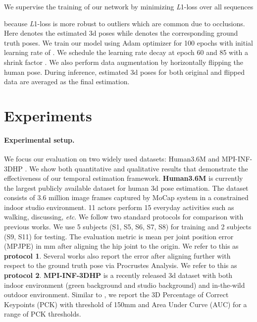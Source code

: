 \documentclass{bmvc2k}
\begin{document}
We supervise the training of our network by minimizing \textit{L}1-loss over all  sequences

because \textit{L}1-loss is more robust to outliers which are common due to occlusions. Here  denotes the estimated 3d poses while  denotes the corresponding ground truth poses. We train our model using Adam \cite{kingma2014adam} optimizer for 100 epochs with initial learning rate of . We schedule the learning rate decay at epoch 60 and 85 with a shrink factor . We also perform data augmentation by horizontally flipping the human pose. During inference, estimated 3d poses for both original and flipped data are averaged as the final estimation.



\section{Experiments}
\label{sec:result}

\paragraph{Experimental setup.} We focus our evaluation on two widely used datasets: Human3.6M \cite{ionescu2014human3} and MPI-INF-3DHP \cite{mehta2016monocular}. We show both quantitative and qualitative results that demonstrate the effectiveness of our temporal estimation framework. \textbf{Human3.6M} is currently the largest publicly available dataset for human 3d pose estimation. The dataset consists of 3.6 million image frames captured by MoCap system in a constrained indoor studio environment. 11 actors perform 15 everyday activities such as walking, discussing, \textit{etc}. We follow two standard protocols for comparison with previous works. We use 5 subjects (S1, S5, S6, S7, S8) for training and 2 subjects (S9, S11) for testing. The evaluation metric is mean per joint position error (MPJPE) in mm after aligning the hip joint to the origin. We refer to this as {\bf protocol 1}. Several works \cite{bogo2016keep,pavlakos2017coarse,sun2017compositional,lee2018propagating,dabral2018learning,zhou2016sparseness,moreno20173d,nie2017monocular,martinez2017simple,fang2018learning,hossain2018exploiting, pavllo20183d} also report the error after aligning further with respect to the ground truth pose via Procrustes Analysis. We refer to this as {\bf protocol 2}. \textbf{MPI-INF-3DHP} is a recently released 3d dataset with both indoor environment (green background and studio background) and in-the-wild outdoor environment. Similar to \cite{mehta2016monocular}, we report the 3D Percentage of Correct Keypoints (PCK) with threshold of 150mm and Area Under Curve (AUC) for a range of PCK thresholds.
\end{document}
